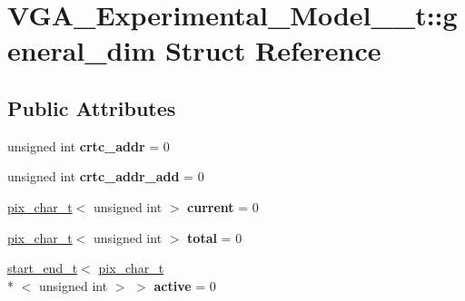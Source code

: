 \hypertarget{structVGA__Experimental__Model__1__t_1_1general__dim}{\section{V\-G\-A\-\_\-\-Experimental\-\_\-\-Model\-\_\-\_\-t\-:\-:general\-\_\-dim Struct Reference}
\label{structVGA__Experimental__Model__1__t_1_1general__dim}
}
\subsection*{Public Attributes}
\begin{DoxyCompactItemize}
\item 
\hypertarget{structVGA__Experimental__Model__1__t_1_1general__dim_a37f10b57fa600f64da5e9de765e3b105}{unsigned int {\bfseries crtc\-\_\-addr} = 0}\label{structVGA__Experimental__Model__1__t_1_1general__dim_a37f10b57fa600f64da5e9de765e3b105}

\item 
\hypertarget{structVGA__Experimental__Model__1__t_1_1general__dim_a5b5c86fbf5f331dbb322d68ae4cf7021}{unsigned int {\bfseries crtc\-\_\-addr\-\_\-add} = 0}\label{structVGA__Experimental__Model__1__t_1_1general__dim_a5b5c86fbf5f331dbb322d68ae4cf7021}

\item 
\hypertarget{structVGA__Experimental__Model__1__t_1_1general__dim_a4e2ba06a871a7ea821dec6151be010d3}{\hyperlink{structVGA__Experimental__Model__1__t_1_1pix__char__t}{pix\-\_\-char\-\_\-t}$<$ unsigned int $>$ {\bfseries current} = 0}\label{structVGA__Experimental__Model__1__t_1_1general__dim_a4e2ba06a871a7ea821dec6151be010d3}

\item 
\hypertarget{structVGA__Experimental__Model__1__t_1_1general__dim_a8f85a164a0c039241055e00a74aa6bcd}{\hyperlink{structVGA__Experimental__Model__1__t_1_1pix__char__t}{pix\-\_\-char\-\_\-t}$<$ unsigned int $>$ {\bfseries total} = 0}\label{structVGA__Experimental__Model__1__t_1_1general__dim_a8f85a164a0c039241055e00a74aa6bcd}

\item 
\hypertarget{structVGA__Experimental__Model__1__t_1_1general__dim_aaf55b03dee3cc3e8e209146578d27761}{\hyperlink{structVGA__Experimental__Model__1__t_1_1start__end__t}{start\-\_\-end\-\_\-t}$<$ \hyperlink{structVGA__Experimental__Model__1__t_1_1pix__char__t}{pix\-\_\-char\-\_\-t}\\*
$<$ unsigned int $>$ $>$ {\bfseries active} = 0}\label{structVGA__Experimental__Model__1__t_1_1general__dim_aaf55b03dee3cc3e8e209146578d27761}


\end{DoxyCompactItemize}
